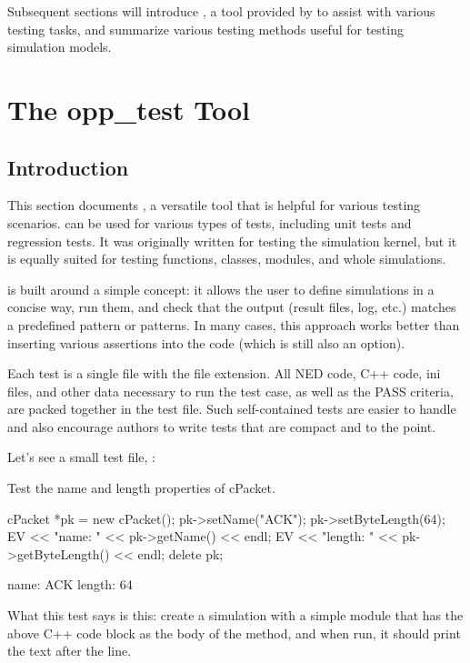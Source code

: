 Subsequent sections will introduce , a tool provided by {\opp}
to assist with various testing tasks, and summarize various testing methods
useful for testing simulation models.


\section{The opp\_test Tool}
\label{sec:testing:opptest}

\subsection{Introduction}
\label{sec:testing:opptest:introduction}

This section documents , a versatile tool that is
helpful for various testing scenarios.  can be used for
various types of tests, including unit tests and regression tests. It was
originally written for testing the {\opp} simulation kernel, but it is
equally suited for testing functions, classes, modules, and whole
simulations.

 is built around a simple concept: it allows the user to define
simulations in a concise way, run them, and check that the output (result
files, log, etc.) matches a predefined pattern or patterns. In many cases,
this approach works better than inserting various assertions into the code
(which is still also an option).

Each test is a single file with the  file extension. All NED
code, C++ code, ini files, and other data necessary to run the test case, as
well as the PASS criteria, are packed together in the test file. Such
self-contained tests are easier to handle and also encourage authors to
write tests that are compact and to the point.

Let's see a small test file, :

\begin{filelisting}
Test the name and length properties of cPacket.

cPacket *pk = new cPacket();
pk->setName("ACK");
pk->setByteLength(64);
EV << "name: " << pk->getName() << endl;
EV << "length: " << pk->getByteLength() << endl;
delete pk;

name: ACK
length: 64
\end{filelisting}

What this test says is this: create a simulation with a simple module
that has the above C++ code block as the body of the  method,
and when run, it should print the text after the  line.

